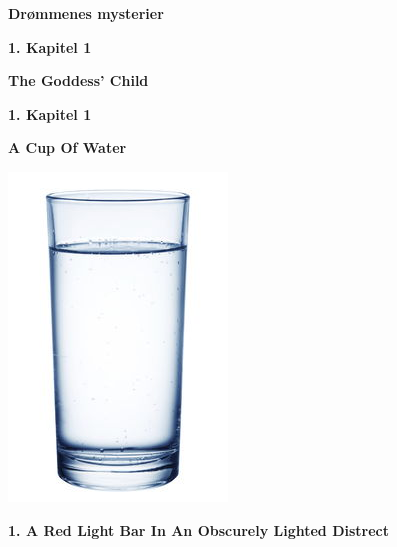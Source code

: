 \documentclass[]{article}
\begin{document}
\newpage

\begin{center}
	\Large\textbf{Drømmenes mysterier}
\end{center}

\begin{center}
	\large\textbf{1. Kapitel 1}
\end{center}

\newpage

\begin{center}
	\Large\textbf{The Goddess' Child}
\end{center}

\begin{center}
	\large\textbf{1. Kapitel 1}
\end{center}

\newpage

\begin{center}
	\Large\textbf{A Cup Of Water}
\end{center}

\begin{center}
	\includegraphics{water4}
\end{center}


\begin{center}
	\large\textbf{1. A Red Light Bar In An \newline Obscurely Lighted Distrect}
\end{center}
\end{document}
